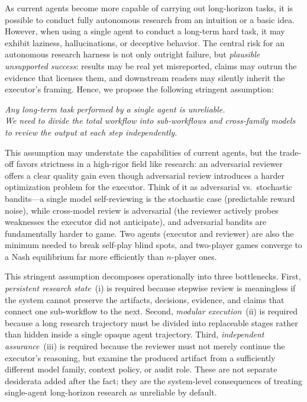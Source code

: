 As current agents become more capable of carrying out long-horizon tasks, it is possible to conduct fully autonomous research from an intuition or a basic idea. However, when using a single agent to conduct a long-term hard task, it may exhibit laziness, hallucinations, or deceptive behavior.
The central risk for an autonomous research harness is not only outright failure, but \emph{plausible unsupported success}: results may be real yet misreported, claims may outrun the evidence that licenses them, and downstream readers may silently inherit the executor's framing. Hence, we propose the following stringent assumption:
\begin{center}
    \textit{Any long-term task performed by a single agent is unreliable.}\\
        \textit{We need to divide the total workflow into sub-workflows and cross-family models to review the output at each step independently.}
\end{center}
This assumption may understate the capabilities of current agents, but the trade-off favors strictness in a high-rigor field like research: an adversarial reviewer offers a clear quality gain even though adversarial review introduces a harder optimization problem for the executor. Think of it as adversarial vs.\ stochastic bandits---a single model self-reviewing is the stochastic case (predictable reward noise), while cross-model review is adversarial (the reviewer actively probes weaknesses the executor did not anticipate), and adversarial bandits are fundamentally harder to game. Two agents (executor and reviewer) are also the minimum needed to break self-play blind spots, and two-player games converge to a Nash equilibrium far more efficiently than $n$-player ones.

This stringent assumption decomposes operationally into three bottlenecks.
First, \emph{persistent research state}~(i) is required because stepwise review is meaningless if the system cannot preserve the artifacts, decisions, evidence, and claims that connect one sub-workflow to the next.
Second, \emph{modular execution}~(ii) is required because a long research trajectory must be divided into replaceable stages rather than hidden inside a single opaque agent trajectory.
Third, \emph{independent assurance}~(iii) is required because the reviewer must not merely continue the executor's reasoning, but examine the produced artifact from a sufficiently different model family, context policy, or audit role.
These are not separate desiderata added after the fact; they are the system-level consequences of treating single-agent long-horizon research as unreliable by default.

